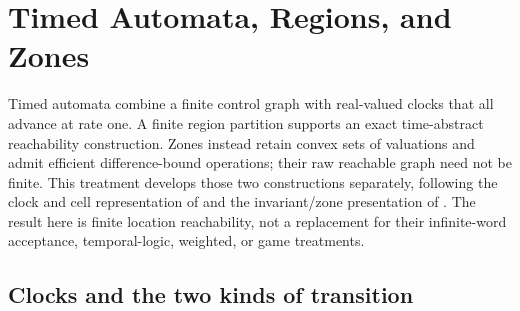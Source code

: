 \chapter{Timed Automata, Regions, and Zones}
\label{sec:p09-timed-automata-regions-and-zones}

Timed automata combine a finite control graph with real-valued clocks that
all advance at rate one. A finite region partition supports an exact
time-abstract reachability construction. Zones instead retain convex sets
of valuations and admit efficient difference-bound operations; their raw
reachable graph need not be finite. This treatment develops those two
constructions separately, following the clock and cell representation of
\textcite[\S\S3.1--3.4,4.1--4.3,5.5]{AlurDill1994TimedOriginal}
and the invariant/zone presentation of
\textcite[\S\S29.2--29.3,29.7.1--29.7.3]{BouyerEtAl2018TimedChapter}.
The result here is finite location reachability, not a replacement for their
infinite-word acceptance, temporal-logic, weighted, or game treatments.

\section{Clocks and the two kinds of transition}
\label{sec:p09-timed-clock-semantics}

